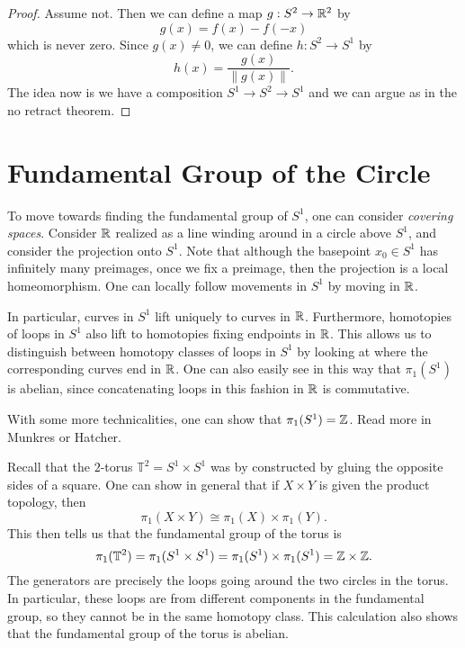 \begin{proof}
  Assume not. Then we can define a map
  $g : S^2 \to \mathbb{R}^2$ by
  \[
    g(x) = f(x) - f(-x)
  \]
  which is never zero. Since $g(x) \ne 0$, we can
  define $h : S^2 \to S^1$ by
  \[
    h(x) = \frac{g(x)}{\|g(x)\|}.
  \]
  The idea now is we have a composition
  $S^1 \to S^2 \to S^1$ and we can argue as in the
  no retract theorem.
\end{proof}

\section{Fundamental Group of the Circle}

\begin{remark}
  To move towards finding the fundamental group of
  $S^1$, one can consider \emph{covering spaces}.
  Consider $\mathbb{R}$ realized as a line winding
  around in a circle above $S^1$, and consider
  the projection onto $S^1$. Note that although the
  basepoint $x_0 \in S^1$ has infinitely many
  preimages, once we fix a preimage, then
  the projection is a local homeomorphism.
  One can locally follow movements in $S^1$
  by moving in $\mathbb{R}$.

  In particular, curves in $S^1$ lift uniquely
  to curves
  in $\mathbb{R}$. Furthermore, homotopies of loops in $S^1$
  also lift to homotopies fixing endpoints in $\mathbb{R}$.
  This allows
  us to distinguish between homotopy classes
  of loops in $S^1$ by looking at where the
  corresponding curves end in $\mathbb{R}$. One can also
  easily see in this way that $\pi_1(S^1)$ is
  abelian, since concatenating loops in this
  fashion in $\mathbb{R}$ is commutative.

  With some more technicalities, one can show
  that $\pi_1(S^1) = \mathbb{Z}$. Read more in Munkres
  or Hatcher.
\end{remark}

\begin{example}
  Recall that the $2$-torus
  $\mathbb{T}^2 = S^1 \times S^1$ was by
  constructed by gluing the opposite sides of a
  square. One can show in general that
  if $X \times Y$ is given the product topology, then
  \[
    \pi_1(X \times Y) \cong \pi_1(X) \times \pi_1(Y).
  \]
  This then tells us that
  the fundamental group of the torus is
  \[
    \pi_1(\mathbb{T}^2) = \pi_1(S^1 \times S^1)
    = \pi_1(S^1) \times \pi_1(S^1) = \mathbb{Z} \times \mathbb{Z}.
  \]
  The generators are precisely the loops going
  around the two circles in the torus. In particular,
  these loops are from different
  components in the fundamental group, so
  they cannot be in the same homotopy class.
  This calculation
  also shows that the fundamental group of the
  torus is abelian.
\end{example}

